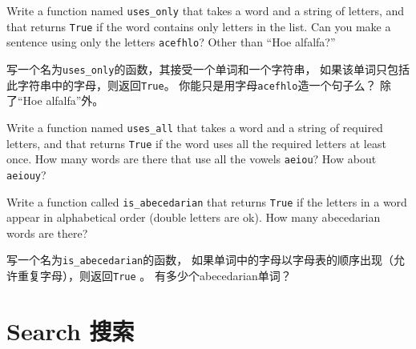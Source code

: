 \documentclass[10pt]{book}
\begin{document}
\begin{CJK}{UTF8}{gbsn}
\begin{exercise}

Write a function named \verb"uses_only" that takes a word and a
string of letters, and that returns {\tt True} if the word contains
only letters in the list.  Can you make a sentence using only the
letters {\tt acefhlo}?  Other than ``Hoe alfalfa?''

写一个名为\verb"uses_only"的函数，其接受一个单词和一个字符串，
如果该单词只包括此字符串中的字母，则返回{\tt True}。
你能只是用字母{\tt acefhlo}造一个句子么？
除了``Hoe alfalfa''外。

\end{exercise}


\begin{exercise} 

Write a function named \verb"uses_all" that takes a word and a
string of required letters, and that returns {\tt True} if the word
uses all the required letters at least once.  How many words are there
that use all the vowels {\tt aeiou}?  How about {\tt aeiouy}?

\end{exercise}


\begin{exercise}

Write a function called \verb"is_abecedarian" that returns
{\tt True} if the letters in a word appear in alphabetical order
(double letters are ok).  
How many abecedarian words are there?

写一个名为\verb"is_abecedarian"的函数，
如果单词中的字母以字母表的顺序出现（允许重复字母），则返回{\tt True} 。
有多少个abecedarian单词？


\end{exercise}






\section{Search 搜索}


\end{CJK}
\end{document}
